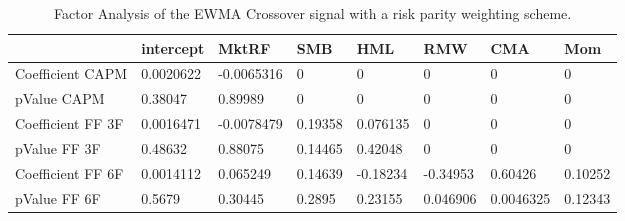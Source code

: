 \begin{table}[H]
\centering
\begin{tabular}{llllllll}
& intercept & MktRF & SMB & HML & RMW & CMA & Mom \\ 
\hline 
Coefficient CAPM & 0.0020622 & -0.0065316 & 0 & 0 & 0 & 0 & 0 \\ 
pValue CAPM & 0.38047 & 0.89989 & 0 & 0 & 0 & 0 & 0 \\ 
Coefficient FF 3F & 0.0016471 & -0.0078479 & 0.19358 & 0.076135 & 0 & 0 & 0 \\ 
pValue FF 3F & 0.48632 & 0.88075 & 0.14465 & 0.42048 & 0 & 0 & 0 \\ 
Coefficient FF 6F & 0.0014112 & 0.065249 & 0.14639 & -0.18234 & -0.34953 & 0.60426 & 0.10252 \\ 
pValue FF 6F & 0.5679 & 0.30445 & 0.2895 & 0.23155 & 0.046906 & 0.0046325 & 0.12343 \\ 
\hline
\end{tabular}
\caption{Factor Analysis of the EWMA Crossover signal with a risk parity weighting scheme.}
\label{MBBSRPNR_FACTOR}
\end{table}